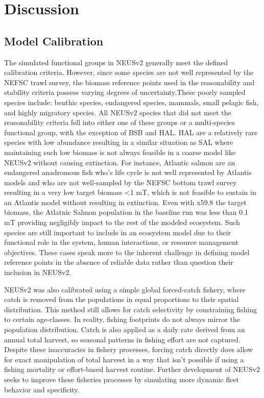 \documentclass[
]{article}
\begin{document}
\section{Discussion}\label{discussion}

\subsection{Model Calibration}\label{model-calibration}

The simulated functional groups in NEUSv2 generally meet the defined calibration criteria. However, since some species are not well represented by the NEFSC trawl survey, the biomass reference points used in the reasonability and stability criteria possess varying degrees of uncertainty.These poorly sampled species include: benthic species, endangered species, mammals, small pelagic fish, and highly migratory species. All NEUSv2 species that did not meet the reasonability criteria fell into either one of these groups or a multi-species functional group, with the exception of BSB and HAL. HAL are a relatively rare species with low abundance resulting in a similar situation as SAL where maintaining such low biomass is not always feasible in a coarse model like NEUSv2 without causing extinction. For instance, Atlantic salmon are an endangered anadromous fish who's life cycle is not well represented by Atlantis models and who are not well-sampled by the NEFSC bottom trawl survey resulting in a very low target biomass \textless1 mT, which is not feasible to sustain in an Atlantis model without resulting in extinction. Even with x59.8 the target biomass, the Atlatnic Salmon population in the baseline run was less than 0.1 mT providing negligibly impact to the rest of the modeled ecosystem. Such species are still important to include in an ecosystem model due to their functional role in the system, human interactions, or resource management objectives. These cases speak more to the inherent challenge in defining model reference points in the absence of reliable data rather than question their inclusion in NEUSv2.

NEUSv2 was also calibrated using a simple global forced-catch fishery, where catch is removed from the populations in equal proportions to their spatial distribution. This method still allows for catch selectivity by constraining fishing to certain age-classes. In reality, fishing footprints do not always mirror the population distribution. Catch is also applied as a daily rate derived from an annual total harvest, so seasonal patterns in fishing effort are not captured. Despite these inaccuracies in fishery processes, forcing catch directly does allow for exact manipulation of total harvest in a way that isn't possible if using a fishing mortality or effort-based harvest routine. Further development of NEUSv2 seeks to improve these fisheries processes by simulating more dynamic fleet behavior and specificity.
\end{document}
